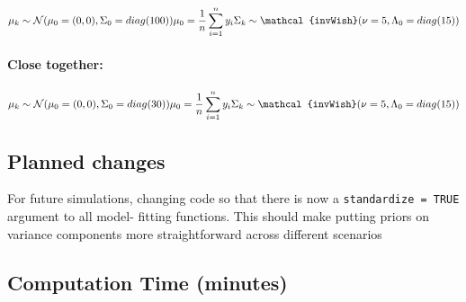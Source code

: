 \documentclass[
]{article}
\begin{document}
\[
  \mu_k \sim \mathcal{N}(\mu_0 = (0,0), \Sigma_0 = diag(100))\\
  \mu_0 = \frac{1}{n}\sum_{i=1}^{n}y_i\\
  \Sigma_k \sim \mathcal{invWish}(\nu = 5, \Lambda_0 = diag(15))
  \]

\hypertarget{close-together-1}{%
\paragraph{Close together:}\label{close-together-1}}

\[
  \mu_k \sim \mathcal{N}(\mu_0 = (0,0), \Sigma_0 = diag(30))\\
  \mu_0 = \frac{1}{n}\sum_{i=1}^{n}y_i\\
  \Sigma_k \sim \mathcal{invWish}(\nu = 5, \Lambda_0 = diag(15))
  \]

\hypertarget{planned-changes}{%
\subsection{Planned changes}\label{planned-changes}}

For future simulations, changing code so that there is now a
\texttt{standardize\ =\ TRUE} argument to all model- fitting functions.
This should make putting priors on variance components more
straightforward across different scenarios

\hypertarget{computation-time-minutes}{%
\subsection{Computation Time (minutes)}\label{computation-time-minutes}}
\end{document}
